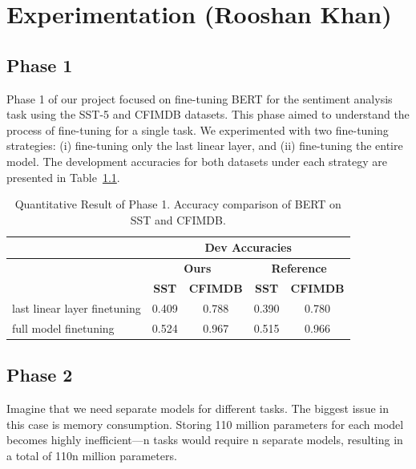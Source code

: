 \chapter{Experimentation (Rooshan Khan)}
\label{Chapter4}

\section{Phase 1}
Phase 1 of our project focused on fine-tuning BERT for the sentiment analysis task using the SST-5 and CFIMDB datasets. This phase aimed to understand the process of fine-tuning for a single task. We experimented with two fine-tuning strategies: (i) fine-tuning only the last linear layer, and (ii) fine-tuning the entire model. The development accuracies for both datasets under each strategy are presented in Table~\ref{tab:phase1_results}.
\begin{table}[H]
\centering
\caption{Quantitative Result of Phase 1. Accuracy comparison of BERT on SST and CFIMDB.}
\label{tab:phase1_results}
\begin{tabular}{l|cc|cc}
\toprule
 & \multicolumn{4}{c}{\textbf{Dev Accuracies}} \\
\midrule
 & \multicolumn{2}{c|}{\textbf{Ours}} & \multicolumn{2}{c}{\textbf{Reference}} \\
 & \textbf{SST} & \textbf{CFIMDB} & \textbf{SST} & \textbf{CFIMDB} \\
\midrule
last linear layer finetuning & 0.409 & 0.788 & 0.390 & 0.780 \\
full model finetuning        & 0.524 & 0.967 & 0.515 & 0.966 \\
\bottomrule
\end{tabular}
\end{table}

\section{Phase 2}
Imagine that we need separate models for different tasks. The biggest issue in this case is memory consumption. Storing 110 million parameters for each model becomes highly inefficient—n tasks would require n separate models, resulting in a total of 110n million parameters.


